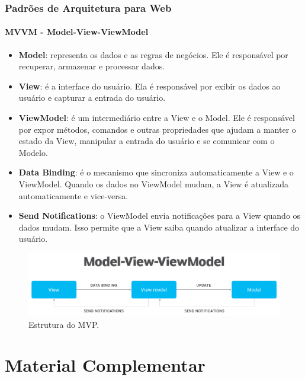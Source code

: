 \documentclass[
	9pt, %
	t, %
]{beamer}
\begin{document}
\begin{frame}
	\frametitle{Padrões de Arquitetura para Web}
	\framesubtitle{MVVM - Model-View-ViewModel}

	{\small 
	\begin{itemize}
		\item \textbf{Model}: representa os dados e as regras de negócios. Ele é responsável por recuperar, armazenar e processar dados.
		\item \textbf{View}: é a interface do usuário. Ela é responsável por exibir os dados ao usuário e capturar a entrada do usuário.
		\item \textbf{ViewModel}: é um intermediário entre a View e o Model. Ele é responsável por expor métodos, comandos e outras propriedades que ajudam a manter o estado da View, manipular a entrada do usuário e se comunicar com o Modelo.
		\item \textbf{Data Binding}: é o mecanismo que sincroniza automaticamente a View e o ViewModel. Quando os dados no ViewModel mudam, a View é atualizada automaticamente e vice-versa.
		\item \textbf{Send Notifications}: o ViewModel envia notificações para a View quando os dados mudam. Isso permite que a View saiba quando atualizar a interface do usuário.
	\end{itemize}
	}

	\begin{figure}
		\centering
		\includegraphics[width=0.9\linewidth]{Images/mvvm.png}
		\caption{Estrutura do MVP.}\label{fig:mvvm}
	\end{figure}

\end{frame}

\section{Material Complementar}
\end{document}
